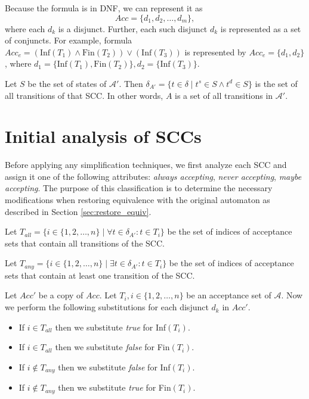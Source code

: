 \documentclass[
  digital, %
  twoside, %
  table,   %
  lof,     %
  lot,     %
]{fithesis3}
\begin{document}
Because the formula is in DNF, we can represent it as 
\begin{equation*}
  Acc = \{d_1, d_2, \dots, d_m\},
\end{equation*}
where each $d_k$ is a disjunct. Further, each such disjunct $d_k$ is represented as a set of conjuncts. For example, formula $Acc_e = (\text{Inf}(T_1) \wedge \text{Fin}(T_2)) \vee (\text{Inf}(T_3))$ is represented by $Acc_e = \{d_1, d_2\}$, where $d_1 = \{\text{Inf}(T_1), \text{Fin}(T_2)\}, d_2 = \{\text{Inf}(T_3)\}$. 

Let $S$ be the set of states of $\mathcal{A'}$. Then $\delta_{A'} = \{t \in \delta \mid t^s \in S \wedge t^d \in S\}$ is the set of all transitions of that SCC. In other words, $A$ is a set of all transitions in $\mathcal{A'}$.

\section{Initial analysis of SCCs}
\label{sec:init_analysis}
Before applying any simplification techniques, we first analyze each SCC and assign it one of the following attributes: \emph{always accepting}, \emph{never accepting}, \emph{maybe accepting}. The purpose of this classification is to determine the necessary modifications when restoring equivalence with the original automaton as described in Section \ref{sec:restore_equiv}. 

Let $T_{all} = \{i \in \{1, 2, \dots, n\} \mid \forall t \in \delta_{A'} \colon t \in T_i \}$ be the set of indices of acceptance sets that contain all transitions of the SCC.

Let $T_{any} = \{i \in \{1, 2, \dots, n\} \mid \exists t \in \delta_{A'} \colon t \in T_i \}$ be the set of indices of acceptance sets that contain at least one transition of the SCC.

Let $Acc'$ be a copy of $Acc$. Let $T_i, i \in \{1, 2, \dots, n\}$ be an acceptance set of $\mathcal{A}$. Now we perform the following substitutions for each disjunct $d_k$ in $Acc'$. 
\begin{itemize}
  \item If $i \in T_{all}$ then we substitute \emph{true} for Inf$(T_i)$.
  \item If $i \in T_{all}$ then we substitute \emph{false} for Fin$(T_i)$.
  \item If $i \notin T_{any}$ then we substitute \emph{false} for Inf$(T_i)$.
  \item If $i \notin T_{any}$ then we substitute \emph{true} for Fin$(T_i)$.
\end{itemize}
\end{document}
